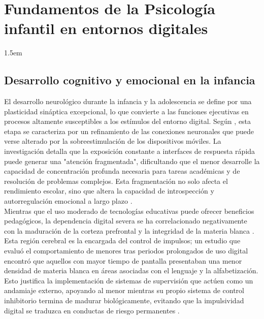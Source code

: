 \chapter[Fundamentos de la Psicología infantil en entornos digitales]{Fundamentos de la Psicología infantil en entornos digitales}
\label{cp:Fundamentos-Psicologia}

\insertminitoc
\parindent1.5em 

\section{Desarrollo cognitivo y emocional en la infancia}

El desarrollo neurológico durante la infancia y la adolescencia se define por una plasticidad sináptica excepcional, lo que convierte a las funciones ejecutivas en procesos altamente susceptibles a los estímulos del entorno digital. Según \cite{clemente-suarez_digital_2024}, esta etapa se caracteriza por un refinamiento de las conexiones neuronales que puede verse alterado por la sobreestimulación de los dispositivos móviles. La investigación detalla que la exposición constante a interfaces de respuesta rápida puede generar una "atención fragmentada", dificultando que el menor desarrolle la capacidad de concentración profunda necesaria para tareas académicas y de resolución de problemas complejos. Esta fragmentación no solo afecta el rendimiento escolar, sino que altera la capacidad de introspección y autorregulación emocional a largo plazo \cite{limone_psychological_2021}. \\

Mientras que el uso moderado de tecnologías educativas puede ofrecer beneficios pedagógicos, la dependencia digital severa se ha correlacionado negativamente con la maduración de la corteza prefrontal y la integridad de la materia blanca \cite{joseph_impact_2022, clemente-suarez_digital_2024}. Esta región cerebral es la encargada del control de impulsos; un estudio que evaluó el comportamiento de menores tras periodos prolongados de uso digital encontró que aquellos con mayor tiempo de pantalla presentaban una menor densidad de materia blanca en áreas asociadas con el lenguaje y la alfabetización. Esto justifica la implementación de sistemas de supervisión que actúen como un andamiaje externo, apoyando al menor mientras su propio sistema de control inhibitorio termina de madurar biológicamente, evitando que la impulsividad digital se traduzca en conductas de riesgo permanentes \cite{borges_off_2025}. \\

